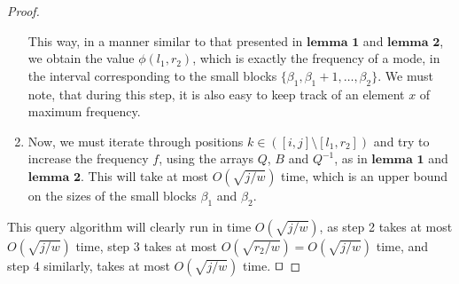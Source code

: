 \documentclass[runningheads]{llncs}
\begin{document}
\begin{proof}
\begin{enumerate}
            This way, in a manner similar to that presented in $\textbf{lemma 1}$ and $\textbf{lemma 2}$, we obtain the value $\phi( l_1, r_2 )$, 
            which is exactly the frequency of a mode, in the interval corresponding to the small blocks $\{\beta_1, \beta_1+1,\dots,\beta_2 \}$. We must note, that during this step, it is also easy 
            to keep track of an element $x$ of maximum frequency.

        \item Now, we must iterate through positions $k \in ( [i,j] \setminus [l_1, r_2] ) $ and try to increase the frequency $f$, using the arrays 
            $Q$, $B$ and $Q^{-1}$, as in $\textbf{lemma 1}$ and $\textbf{lemma 2}$. This will take at most $O(\sqrt{j/w})$ time, which is an upper bound on the sizes of the small blocks $\beta_1$ and $\beta_2$.
        
        

    \end{enumerate}

    This query algorithm will clearly run in time $O(\sqrt{j/w})$, as step 2 takes at most $O(\sqrt{j/w})$ time, step $3$ takes at most $O(\sqrt{ r_2/w } )=O(\sqrt{j/w})$ time, 
    and step $4$ similarly, takes at most $O(\sqrt{j/w})$ time. $\qed$

\end{proof}
\end{document}
